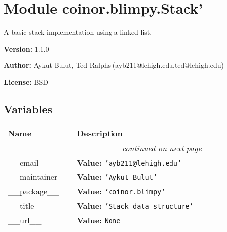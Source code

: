 %
%
%


\section{Module coinor.blimpy.Stack'}

    \label{coinor:blimpy:Stack'}
A basic stack implementation using a linked list.

\textbf{Version:} 1.1.0



\textbf{Author:} Aykut Bulut, Ted Ralphs (ayb211@lehigh.edu,ted@lehigh.edu)



\textbf{License:} BSD





  \subsection{Variables}

    \vspace{-1cm}
\hspace{\varindent}\begin{longtable}{|p{\varnamewidth}|p{\vardescrwidth}|l}
\cline{1-2}
\cline{1-2} \centering \textbf{Name} & \centering \textbf{Description}& \\
\cline{1-2}
\endhead\cline{1-2}\multicolumn{3}{r}{\small\textit{continued on next page}}\\\endfoot\cline{1-2}
\endlastfoot\raggedright \_\-\_\-e\-m\-a\-i\-l\-\_\-\_\- & \raggedright \textbf{Value:} 
{\tt \texttt{'}\texttt{ayb211@lehigh.edu}\texttt{'}}&\\
\cline{1-2}
\raggedright \_\-\_\-m\-a\-i\-n\-t\-a\-i\-n\-e\-r\-\_\-\_\- & \raggedright \textbf{Value:} 
{\tt \texttt{'}\texttt{Aykut Bulut}\texttt{'}}&\\
\cline{1-2}
\raggedright \_\-\_\-p\-a\-c\-k\-a\-g\-e\-\_\-\_\- & \raggedright \textbf{Value:} 
{\tt \texttt{'}\texttt{coinor.blimpy}\texttt{'}}&\\
\cline{1-2}
\raggedright \_\-\_\-t\-i\-t\-l\-e\-\_\-\_\- & \raggedright \textbf{Value:} 
{\tt \texttt{'}\texttt{Stack data structure}\texttt{'}}&\\
\cline{1-2}
\raggedright \_\-\_\-u\-r\-l\-\_\-\_\- & \raggedright \textbf{Value:} 
{\tt None}&\\
\cline{1-2}
\end{longtable}


